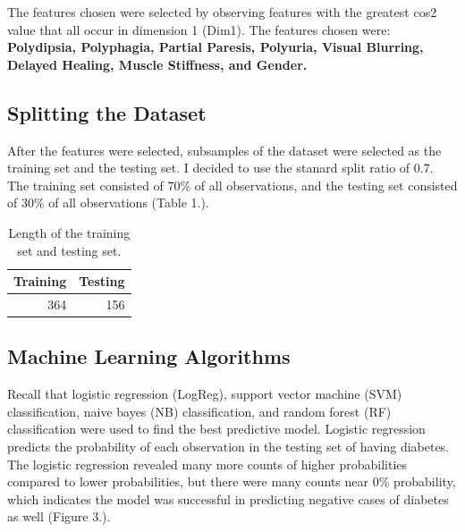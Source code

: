 \documentclass[
]{article}
\begin{document}
The features chosen were selected by observing features with the
greatest cos2 value that all occur in dimension 1 (Dim1). The features
chosen were: \textbf{Polydipsia, Polyphagia, Partial Paresis, Polyuria,
Visual Blurring, Delayed Healing, Muscle Stiffness, and Gender.}

\hypertarget{splitting-the-dataset}{%
\subsection{Splitting the Dataset}\label{splitting-the-dataset}}

After the features were selected, subsamples of the dataset were
selected as the training set and the testing set. I decided to use the
stanard split ratio of 0.7. The training set consisted of 70\% of all
observations, and the testing set consisted of 30\% of all observations
(Table 1.).

\begin{table}[h!]

\caption{\label{tab:unnamed-chunk-4}Length of the training set and testing set.}
\centering
\begin{tabular}[t]{r|r}
\hline
Training & Testing\\
\hline
364 & 156\\
\hline
\end{tabular}
\end{table}

\hypertarget{machine-learning-algorithms}{%
\subsection{Machine Learning
Algorithms}\label{machine-learning-algorithms}}

Recall that logistic regression (LogReg), support vector machine (SVM)
classification, naive bayes (NB) classification, and random forest (RF) classification were used to find
the best predictive model. Logistic regression predicts the probability
of each observation in the testing set of having diabetes. The logistic
regression revealed many more counts of higher probabilities compared to
lower probabilities, but there were many counts near 0\% probability,
which indicates the model was successful in predicting negative cases of
diabetes as well (Figure 3.).
\end{document}

